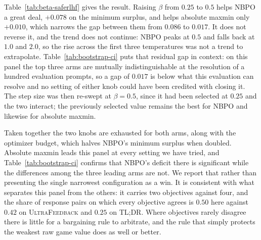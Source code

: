 \documentclass{article}
\theoremstyle{remark}
\theoremstyle{plain}
\newcommand{\NBPO}{\textsc{NBPO}}
\begin{document}
Table~\ref{tab:beta-saferlhf} gives the result. Raising $\beta$ from $0.25$ to $0.5$ helps \NBPO{} a great
deal, $+0.078$ on the minimum surplus, and helps absolute maxmin only $+0.010$, which narrows the gap
between them from $0.086$ to $0.017$. It does not reverse it, and the trend does not continue: \NBPO{}
peaks at $0.5$ and falls back at $1.0$ and $2.0$, so the rise across the first three temperatures was not
a trend to extrapolate. Table~\ref{tab:bootstrap-ci} puts that residual gap in context: on this panel the
top three arms are mutually indistinguishable at the resolution of a hundred evaluation prompts, so a gap
of $0.017$ is below what this evaluation can resolve and no setting of either knob could have been
credited with closing it. The step size was then re-swept at $\beta=0.5$, since it had been selected at
$0.25$ and the two interact; the previously selected value remains the best for \NBPO{} and likewise for
absolute maxmin.

Taken together the two knobs are exhausted for both arms, along with the optimizer budget, which halves
\NBPO{}'s minimum surplus when doubled. Absolute maxmin leads this panel at every setting we have tried, and
Table~\ref{tab:bootstrap-ci} confirms that \NBPO{}'s deficit there is significant while the differences
among the three leading arms are not. We report that rather than presenting the single narrowest
configuration as a win. It is consistent with
what separates this panel from the others: it carries two objectives against four, and the share of
response pairs on which every objective agrees is $0.50$ here against $0.42$ on \textsc{UltraFeedback} and
$0.25$ on \textsc{TL;DR}. Where objectives rarely disagree there is little for a bargaining rule to
arbitrate, and the rule that simply protects the weakest raw game value does as well or better.
\end{document}
